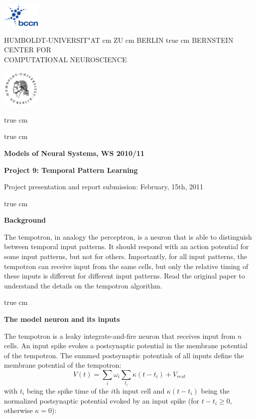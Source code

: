 \documentclass[12pt]{article}
\begin{document}
\parbox{2cm}{
\includegraphics[width=1.8cm]{../bccnlogo.pdf}
}
\parbox{11cm}{
\begin{center}
\large HUMBOLDT-UNIVERSIT"AT  cm ZU  cm BERLIN
 true cm
\mgross BERNSTEIN CENTER FOR\\ COMPUTATIONAL NEUROSCIENCE
\end{center}
}
\parbox{2cm}
{
\hfill
\includegraphics[width=1.8cm]{../hublogo.pdf}
}

 true cm



 true cm
\centerline{\bf Models of Neural Systems, WS 2010/11}
\centerline{\bf Project 9: Temporal Pattern Learning}
\centerline{Project presentation and report submission: February,
15th, 2011}

 true cm

{\bf Background}

The tempotron, in analogy the perceptron, is a neuron that is able to
distinguish between temporal input patterns. It should
respond with an action potential for some input patterns, but not for
others. Importantly, for all input patterns, the tempotron can receive
input from the same cells, but only the relative timing of these inputs is
different for different input patterns. Read the original paper
\citep{Guetig06} to understand the details on the
tempotron algorithm.

 true cm

{\bf The model neuron and its inputs} 

The tempotron is a leaky integrate-and-fire neuron that receives input
from $n$ cells. An input spike evokes a postsynaptic potential in the
membrane potential of the tempotron. The summed postsynaptic
potentials of all inputs define the membrane potential of the
tempotron: $$V(t)=\sum_i \omega_i \sum_{t_i}\kappa (t - t_i) +
V_{rest}$$ with $t_i$ being the spike time of the $i$th input cell and
$\kappa (t - t_i)$ being the normalized postsynaptic potential evoked
by an input spike (for $t-t_i \ge0$, otherwise $\kappa =0$):
\end{document}
